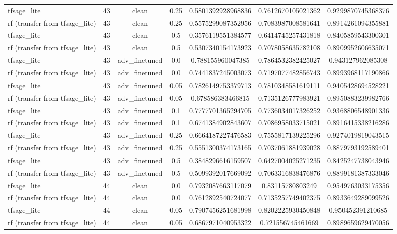 \begin{table}[htbp]
\begin{tabular}{lcccccc}
tfsage\_lite & 43 & clean & 0.25 & 0.5801392928968836 & 0.7612670105021362 & 0.9299870745368376 \\
rf (transfer from tfsage\_lite) & 43 & clean & 0.25 & 0.5575299087352956 & 0.7083987008581641 & 0.8914261094355881 \\
tfsage\_lite & 43 & clean & 0.5 & 0.3576119551384577 & 0.6414745257431818 & 0.8405859543300301 \\
rf (transfer from tfsage\_lite) & 43 & clean & 0.5 & 0.5307340154173923 & 0.7078058635782108 & 0.8909952606635071 \\
tfsage\_lite & 43 & adv\_finetuned & 0.0 & 0.788155960047385 & 0.7864532382425027 & 0.943127962085308 \\
rf (transfer from tfsage\_lite) & 43 & adv\_finetuned & 0.0 & 0.7441837245003073 & 0.7197077482856743 & 0.8993968117190866 \\
tfsage\_lite & 43 & adv\_finetuned & 0.05 & 0.7826149753379713 & 0.7810348581619111 & 0.9405428694528221 \\
rf (transfer from tfsage\_lite) & 43 & adv\_finetuned & 0.05 & 0.678586383466815 & 0.7135126777983921 & 0.8950883239982766 \\
tfsage\_lite & 43 & adv\_finetuned & 0.1 & 0.7777701365294705 & 0.7736034017326252 & 0.9368806548901336 \\
rf (transfer from tfsage\_lite) & 43 & adv\_finetuned & 0.1 & 0.6741384902843607 & 0.7086958033715021 & 0.8916415338216286 \\
tfsage\_lite & 43 & adv\_finetuned & 0.25 & 0.6664187227476583 & 0.7555817139225296 & 0.9274019819043515 \\
rf (transfer from tfsage\_lite) & 43 & adv\_finetuned & 0.25 & 0.5551300374173165 & 0.7037061881939028 & 0.8879793192589401 \\
tfsage\_lite & 43 & adv\_finetuned & 0.5 & 0.3848296616159507 & 0.6427004025271235 & 0.8425247738043946 \\
rf (transfer from tfsage\_lite) & 43 & adv\_finetuned & 0.5 & 0.5099392017669092 & 0.7063316838476876 & 0.8899181387333046 \\
tfsage\_lite & 44 & clean & 0.0 & 0.7932087663117079 & 0.83115780803249 & 0.9549763033175356 \\
rf (transfer from tfsage\_lite) & 44 & clean & 0.0 & 0.7612892540724077 & 0.7135257749402375 & 0.8933649289099526 \\
tfsage\_lite & 44 & clean & 0.05 & 0.7907456251681998 & 0.8202225930450848 & 0.950452391210685 \\
rf (transfer from tfsage\_lite) & 44 & clean & 0.05 & 0.6867971040953322 & 0.721556745461669 & 0.8989659629470056 \\

\end{tabular}
\end{table}
